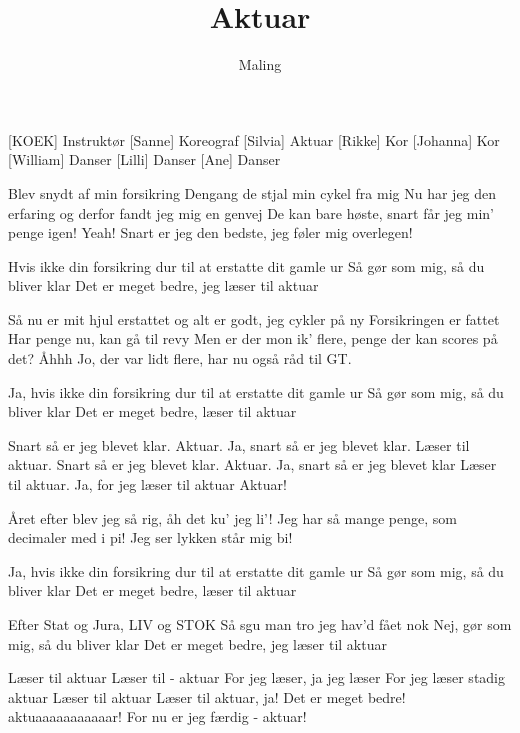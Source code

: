 \documentclass[a4paper,11pt]{article}
\title{Aktuar}
\author{Maling}
\begin{document}
\maketitle

\begin{roles}
[KOEK] Instruktør
[Sanne] Koreograf
[Silvia] Aktuar
[Rikke] Kor
[Johanna] Kor
[William] Danser
[Lilli] Danser
[Ane] Danser
\end{roles}


\begin{song}
Blev snydt af min forsikring
Dengang de stjal min cykel fra mig
Nu har jeg den erfaring
og derfor fandt jeg mig en genvej
De kan bare høste, snart får jeg min' penge igen! Yeah!
Snart er jeg den bedste, jeg føler mig overlegen!
 
Hvis ikke din forsikring dur
til at erstatte dit gamle ur
Så gør som mig, så du bliver klar
Det er meget bedre, jeg læser til aktuar
 
Så nu er mit hjul erstattet
og alt er godt, jeg cykler på ny
Forsikringen er fattet
Har penge nu, kan gå til revy
Men er der mon ik' flere, penge der kan scores på det? Åhhh
Jo, der var lidt flere, har nu også råd til GT.
 
Ja, hvis ikke din forsikring dur
til at erstatte dit gamle ur
Så gør som mig, så du bliver klar
Det er meget bedre, læser til aktuar
 
 Snart så er jeg blevet klar.
 Aktuar.
Ja, snart så er jeg blevet klar.
 Læser til aktuar.
 Snart så er jeg blevet klar.
 Aktuar.
 Ja, snart så er jeg blevet klar
 Læser til aktuar.
 Ja, for jeg læser til aktuar 
 Aktuar!

Året efter blev jeg så rig, åh det ku' jeg li'!
Jeg har så mange penge, som decimaler med i pi! Jeg ser lykken står mig bi!

Ja, hvis ikke din forsikring dur
til at erstatte dit gamle ur
Så gør som mig, så du bliver klar
Det er meget bedre, læser til aktuar

Efter Stat og Jura, LIV og STOK
Så sgu man tro jeg hav'd fået nok
Nej, gør som mig, så du bliver klar
Det er meget bedre, jeg læser til aktuar

Læser til aktuar
Læser til - aktuar
For jeg læser, ja jeg læser
For jeg læser stadig aktuar
Læser til aktuar
Læser til aktuar, ja!
Det er meget bedre!
aktuaaaaaaaaaaar! For nu er jeg færdig - aktuar!

\end{song}
\end{document}
